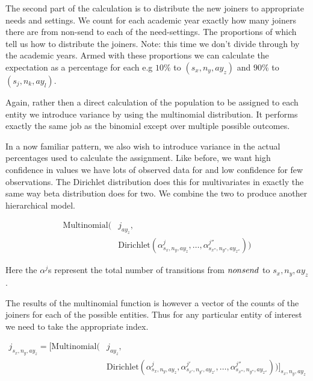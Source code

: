 \documentclass[margin=5mm]{article}
\begin{document}
The second part of the calculation is to distribute the new joiners to
appropriate needs and settings.  We count for each academic year
exactly how many joiners there are from non-send to each of the
need-settings.  The proportions of which tell us how to distribute the
joiners.  Note: this time we don't divide through by the academic
years.  Armed with these proportions we can calculate the expectation
as a percentage for each e.g $10\%$ to $(s_x,n_y,ay_z)$ and $90\%$ to
$(s_j,n_k,ay_l)$.

Again, rather then a direct calculation of the population to be
assigned to each entity we introduce variance by using the multinomial
distribution.  It performs exactly the same job as the binomial except
over multiple possible outcomes.

In a now familiar pattern, we also wish to introduce variance in the
actual percentages used to calculate the assignment.  Like before, we
want high confidence in values we have lots of observed data for and
low confidence for few observations.  The Dirichlet distribution does
this for multivariates in exactly the same way beta distribution does
for two.  We combine the two to produce another hierarchical model.

\begin{equation*}
\begin{split}
  \text{Multinomial} ( & j_{ay_{z}}, \\
  & \text{Dirichlet} (\alpha^{j}_{s_x,n_y,ay_z}, \dots,
  \alpha^{j''}_{s_{x''},n_{y''},ay_{z''}}))
\end{split}
\end{equation*}

Here the $\alpha^{j}$s represent the total number of transitions from
$non\-send$ to ${s_x,n_y,ay_z}$.

The results of the multinomial function is however a vector of the
counts of the joiners for each of the possible entities.  Thus for any
particular entity of interest we need to take the appropriate index.

\begin{equation*}
  \begin{split}
    j_{s_x,n_y,ay_z} = \bigg[\text{Multinomial}( & j_{ay_z}, \\
    & \text{Dirichlet}(\alpha^{j}_{s_x,n_y,ay_z},\alpha^{j'}_{s_{x'},n_{y'},ay_{z'}}, \dots, \alpha^{j''}_{s_{x''},n_{y''},ay_{z''}}))\bigg]_{s_x,n_y,ay_z}
  \end{split}
\end{equation*}
\end{document}
